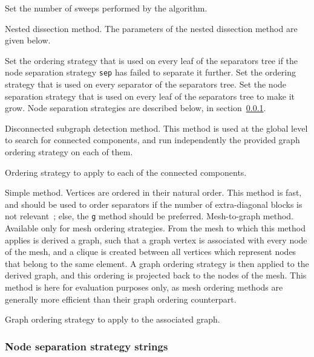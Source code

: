 \begin{itemize}
\begin{itemize}
\iteme[{\tt pass=}{\it nbr}]
Set the number of sweeps performed by the algorithm.
\end{itemize}
\iteme[{\tt n}]
Nested dissection method. The parameters of the nested dissection method are
given below.
\begin{itemize}
\iteme[{\tt ole=}{\it strat}]
Set the ordering strategy that is used on every leaf of the separators tree
if the node separation strategy {\tt sep} has failed to separate it further.
\iteme[{\tt ose=}{\it strat}]
Set the ordering strategy that is used on every separator of the separators
tree.
\iteme[{\tt sep=}{\it strat}]
Set the node separation strategy that is used on every leaf of the
separators tree to make it grow. Node separation strategies are
described below, in section~\ref{sec-lib-format-strat-nsep}.
\end{itemize}
\iteme[{\tt o}]
Disconnected subgraph detection method. This method is used at the
global level to search for connected components, and run independently
the provided graph ordering strategy on each of them.
\begin{itemize}
\iteme[{\tt strat=}{\it strat}]
Ordering strategy to apply to each of the connected components.
\end{itemize}
\iteme[{\tt s}]
Simple method. Vertices are ordered in their natural order. This
method is fast, and should be used to order separators if the number
of extra-diagonal blocks is not relevant~; else, the {\tt g} method
should be preferred.
\iteme[{\tt v}]
Mesh-to-graph method. Available only for mesh ordering strategies.
From the mesh to which this method applies is derived a graph,
such that a graph vertex is associated with every node of the
mesh, and a clique is created between all vertices which represent
nodes that belong to the same element. A graph ordering strategy is
then applied to the derived graph, and this ordering is projected
back to the nodes of the mesh. This method is here for evaluation
purposes only, as mesh ordering methods are generally more
efficient than their graph ordering counterpart.
\begin{itemize}
\iteme[{\tt strat=}{\it strat}]
Graph ordering strategy to apply to the associated graph.
\end{itemize}
\end{itemize}

\subsubsection{Node separation strategy strings}
\label{sec-lib-format-strat-nsep}

